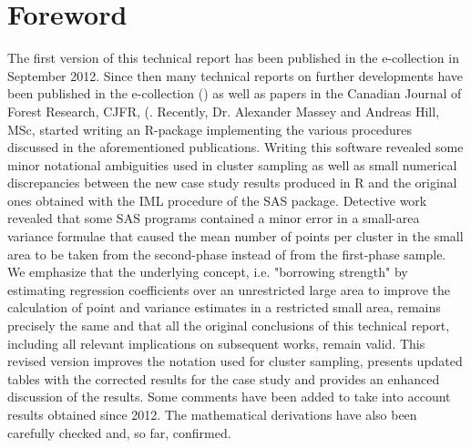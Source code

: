 \documentclass[a4paper,12pt,leqno, titlepage]{article}
\begin{document}
\section*{Foreword}
The first version of this technical report has been published in the e-collection in September 2012. Since then many technical reports on further developments have been published in the e-collection
 (\cite{mandallazreport2,mandallazreport3,mandallazreport4,mandallazreport5,masseyphd}) as well as papers in the Canadian Journal of Forest Research, CJFR, (\cite{mandallaz3,mandallaz4,mandallaz5,massey1,massey2,massey3}. Recently, Dr. Alexander Massey and Andreas Hill, MSc, started writing an R-package implementing the various procedures discussed in the aforementioned publications.  Writing this software revealed some minor notational ambiguities used in cluster sampling as well as small numerical discrepancies between the new case study results produced in R and the original ones obtained with the IML procedure of the SAS package.  Detective work revealed that some SAS programs contained a minor error in a small-area variance formulae that caused the mean number of points per cluster in the small area to be taken from the second-phase instead of from the first-phase sample.  We emphasize that the underlying concept, i.e. "borrowing strength" by estimating regression coefficients over an unrestricted large area to improve the calculation of point and variance estimates in a restricted small area, remains precisely the same and that all the original conclusions of this technical report, including all relevant implications on subsequent works, remain valid.  This revised version improves the notation used for cluster sampling, presents updated tables with the corrected results for the case study and provides an enhanced discussion of the results. Some comments have been added to take into account results obtained since 2012. The mathematical derivations have also been carefully checked and, so far, confirmed.


\newpage
\pagestyle{plain}
\end{document}
